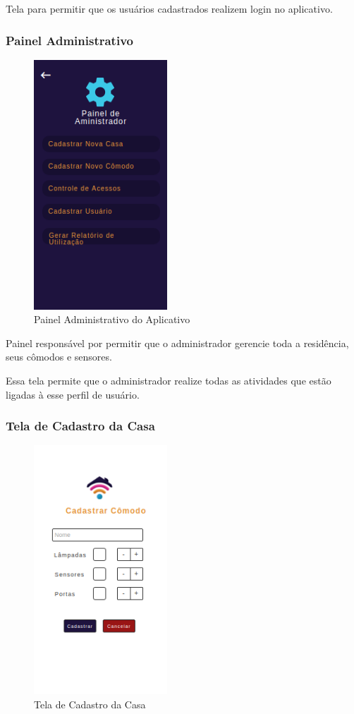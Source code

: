 \par Tela para permitir que os usuários cadastrados realizem login no aplicativo.

\subsubsection{Painel Administrativo}

\begin{figure}[!h]
\centering
\caption{Painel Administrativo do Aplicativo}
\includegraphics[width=5cm]{figuras/painel_adm}
\end{figure}

\par Painel responsável por permitir que o administrador gerencie toda a residência, seus cômodos e sensores.
\par Essa tela permite que o administrador realize todas as atividades que estão ligadas à esse perfil de usuário.

\subsubsection{Tela de Cadastro da Casa}

\begin{figure}[!h]
\centering
\caption{Tela de Cadastro da Casa}
\includegraphics[width=5cm]{figuras/cadastro_casa}
\end{figure}

